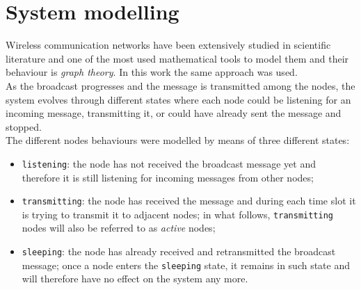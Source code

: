 %
\chapter{System modelling}
\label{ch:modelling}
Wireless communication networks have been extensively studied in scientific
literature and one of the most used mathematical tools to model them and their
behaviour is \textit{graph theory}. In this work the same approach was used.\\
As the broadcast progresses and the message is transmitted among the nodes, the system evolves through different states where each node could be listening for an incoming message, transmitting it, or could have already sent the message and stopped.\\
The different nodes behaviours were modelled by means
of three different states:
\begin{itemize}
	\item \texttt{listening}: the node has not received the broadcast message
	yet and therefore it is still listening for incoming messages from other nodes;
	\item \texttt{transmitting}: the node has received the message and during
	each time slot it is trying to transmit it to adjacent nodes; in what
	follows, \texttt{transmitting} nodes will also be referred to as
	\textit{active} nodes;
	\item \texttt{sleeping}: the node has already received and retransmitted
	the broadcast message; once a node enters the \texttt{sleeping} state, it
	remains in such state and will therefore have no effect on the system
	any more.
\end{itemize}
